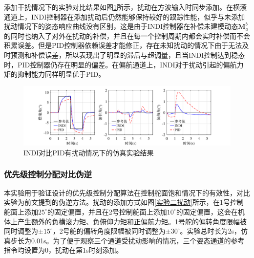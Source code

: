 添加干扰情况下的实验对比结果如图\ref{INDI对比PID仿真有扰动}所示，扰动在方波输入时同步添加。在横滚通道上，INDI控制器在添加扰动后仍然能够保持较好的跟踪性能，似乎与未添加扰动情况下的姿态响应曲线没有区别，这是由于INDI控制器在补偿未建模动态$\boldsymbol{M}_a^b$的同时也纳入了对外在扰动的补偿，并且在每一个控制周期内都会实时补偿而不会积累误差。但是PID控制器依赖误差才能修正，存在未知扰动的情况下由于无法及时预测和补偿误差，所以表现出了明显的滞后与超调量，且当INDI控制达到稳态时，PID控制器仍存在明显的偏差。在偏航通道上，INDI对于扰动引起的偏航力矩的抑制能力同样明显优于PID。
\begin{figure}[htbp]
	\centering
	\begin{minipage}[c]{1\textwidth}
        \centering
        \includegraphics[scale=1]{Fig/INDI对比PID有扰动仿真实验结果.pdf}
        \caption{\label{INDI对比PID仿真有扰动}INDI对比PID有扰动情况下的仿真实验结果}
        \end{minipage}
\end{figure}

\subsubsection{优先级控制分配对比伪逆}

本实验用于验证设计的优先级控制分配算法在控制舵面饱和情况下的有效性，对比实验为前文提到的伪逆方法。扰动的添加方式如图\ref{实验二扰动}所示，在1号控制舵面上添加$25^{\circ}$的固定偏置，并且在2号控制舵面上添加$10^{\circ}$的固定偏置，这会在机体上产生额外的负横滚力矩、负俯仰力矩和正偏航力矩。1号舵的偏转角度限幅被同时调整为$\pm15^{\circ}$，2号舵的偏转角度限幅被同时调整为$\pm30^{\circ}$。实验总时长为2s，仿真步长为0.01s。为了便于观察三个通道受扰动影响的情况，三个姿态通道的参考指令均设置为0，扰动在第1s时刻添加。


